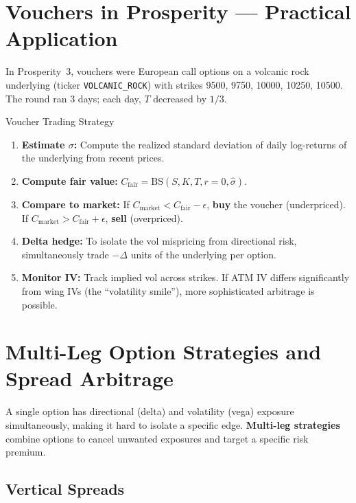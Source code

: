 \documentclass[12pt,a4paper,openany]{report}
\theoremstyle{definition}
\begin{document}
\section{Vouchers in Prosperity — Practical Application}

In Prosperity~3, vouchers were European call options on a volcanic rock underlying (ticker \texttt{VOLCANIC\_ROCK}) with strikes 9500, 9750, 10000, 10250, 10500. The round ran 3 days; each day, $T$ decreased by $1/3$.

\begin{keyconceptbox}{Voucher Trading Strategy}
\begin{enumerate}[label=\arabic*.]
  \item \textbf{Estimate $\sigma$:} Compute the realized standard deviation of daily log-returns of the underlying from recent prices.
  \item \textbf{Compute fair value:} $C_{\text{fair}} = \text{BS}(S, K, T, r=0, \hat{\sigma})$.
  \item \textbf{Compare to market:} If $C_{\text{market}} < C_{\text{fair}} - \epsilon$, \textbf{buy} the voucher (underpriced). If $C_{\text{market}} > C_{\text{fair}} + \epsilon$, \textbf{sell} (overpriced).
  \item \textbf{Delta hedge:} To isolate the vol mispricing from directional risk, simultaneously trade $-\Delta$ units of the underlying per option.
  \item \textbf{Monitor IV:} Track implied vol across strikes. If ATM IV differs significantly from wing IVs (the ``volatility smile''), more sophisticated arbitrage is possible.
\end{enumerate}
\end{keyconceptbox}

\section{Multi-Leg Option Strategies and Spread Arbitrage}

A single option has directional (delta) and volatility (vega) exposure simultaneously, making it hard to isolate a specific edge. \textbf{Multi-leg strategies} combine options to cancel unwanted exposures and target a specific risk premium.

\subsection{Vertical Spreads}
\end{document}
